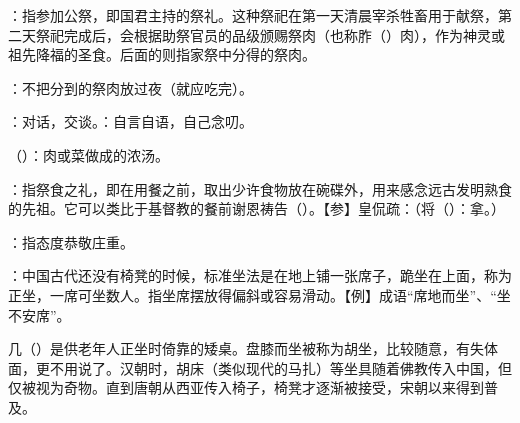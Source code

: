 {
\item {}：指参加公祭，即国君主持的祭礼。这种祭祀在第一天清晨宰杀牲畜用于献祭，第二天祭祀完成后，会根据助祭官员的品级颁赐祭肉（也称胙（）肉），作为神灵或祖先降福的圣食。后面的则指家祭中分得的祭肉。
\item {}：不把分到的祭肉放过夜（就应吃完）。
}
{}


{
\item {}：对话，交谈。：自言自语，自己念叨。
}
{}


{
\item {}（）：肉或菜做成的浓汤。
\item {}：指祭食之礼，即在用餐之前，取出少许食物放在碗碟外，用来感念远古发明熟食的先祖。它可以类比于基督教的餐前谢恩祷告（）。【参】皇侃疏：（将（）：拿。）
\item {}：指态度恭敬庄重。
}
{}


{
\item {}：中国古代还没有椅凳的时候，标准坐法是在地上铺一张席子，跪坐在上面，称为正坐，一席可坐数人。指坐席摆放得偏斜或容易滑动。【例】成语“席地而坐”、“坐不安席”。

几（）是供老年人正坐时倚靠的矮桌。盘膝而坐被称为胡坐，比较随意，有失体面，更不用说了。汉朝时，胡床（类似现代的马扎）等坐具随着佛教传入中国，但仅被视为奇物。直到唐朝从西亚传入椅子，椅凳才逐渐被接受，宋朝以来得到普及。
}
{}


